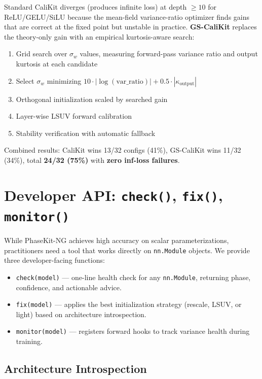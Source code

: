 \documentclass[10pt]{article}
\begin{document}
Standard CaliKit diverges (produces infinite loss) at depth $\geq 10$ for ReLU/GELU/SiLU because the mean-field variance-ratio optimizer finds gains that are correct at the fixed point but unstable in practice.
\textbf{GS-CaliKit} replaces the theory-only gain with an empirical kurtosis-aware search:
\begin{enumerate}
\item Grid search over $\sigma_w$ values, measuring forward-pass variance ratio and output kurtosis at each candidate
\item Select $\sigma_w$ minimizing $10 \cdot |\log(\text{var\_ratio})| + 0.5 \cdot |\kappa_{\text{output}}|$
\item Orthogonal initialization scaled by searched gain
\item Layer-wise LSUV forward calibration
\item Stability verification with automatic fallback
\end{enumerate}

Combined results: CaliKit wins 13/32 configs (41\%), GS-CaliKit wins 11/32 (34\%), total \textbf{24/32 (75\%)} with \textbf{zero inf-loss failures}.

\section{Developer API: \texttt{check()}, \texttt{fix()}, \texttt{monitor()}}
\label{sec:developer-api}

While PhaseKit-NG achieves high accuracy on scalar parameterizations, practitioners need a tool that works directly on \texttt{nn.Module} objects. We provide three developer-facing functions:

\begin{itemize}
\item \texttt{check(model)} --- one-line health check for any \texttt{nn.Module}, returning phase, confidence, and actionable advice.
\item \texttt{fix(model)} --- applies the best initialization strategy (rescale, LSUV, or light) based on architecture introspection.
\item \texttt{monitor(model)} --- registers forward hooks to track variance health during training.
\end{itemize}

\subsection{Architecture Introspection}
\end{document}
